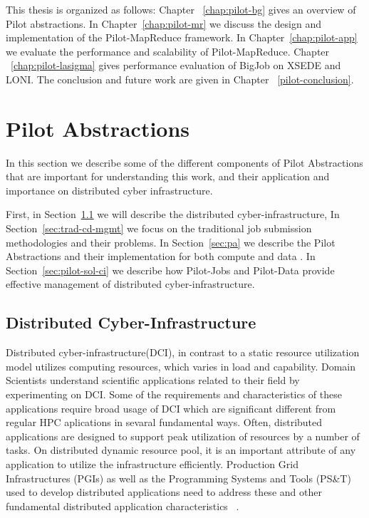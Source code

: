 \documentclass[12pt]{report}
\newcommand{\pilot}{Pilot\xspace}
\newcommand{\pilotmapreduce}{Pilot-MapReduce\xspace}
\begin{document}
This thesis is organized as follows: Chapter ~\ref{chap:pilot-bg} gives an overview of \pilot
abstractions. In Chapter~\ref{chap:pilot-mr} we discuss the design and implementation of the \pilotmapreduce framework.
In Chapter~\ref{chap:pilot-app} we evaluate the performance and scalability  of  \pilotmapreduce.
Chapter ~\ref{chap:pilot-lasigma} gives performance evaluation of BigJob on XSEDE and LONI. The conclusion and future work are given in Chapter ~\ref{pilot-conclusion}.

\chapter{Pilot Abstractions} \label{chap:bg}

In this section we describe some of the different components of Pilot Abstractions that are important for understanding this work, and their application and 
importance on distributed cyber infrastructure. 

First, in Section~\ref{sec:ci} we will describe the distributed cyber-infrastructure,  In Section~\ref{sec:trad-cd-mgmt} we focus on the traditional job submission methodologies and their problems. 
 In Section~\ref{sec:pa} we describe the Pilot Abstractions and their implementation for both compute and data . In Section~\ref{sec:pilot-sol-ci} we describe how Pilot-Jobs and Pilot-Data provide
effective management of distributed cyber-infrastructure.

\section{Distributed Cyber-Infrastructure} \label{sec:ci}

Distributed cyber-infrastructure(DCI), in contrast to a static resource utilization model utilizes computing resources, which varies in load and capability.
Domain Scientists understand scientific applications related to their field by experimenting on DCI. Some of the requirements and characteristics of these 
applications require broad usage of DCI which are significant different from regular HPC aplications in sevaral fundamental ways. Often, distributed applications 
are designed to support peak utilization of resources by a number of tasks. On distributed dynamic resource pool, it is an important attribute of any application to
utilize the infrastructure efficiently. Production Grid Infrastructures (PGIs) as well as the Programming Systems and Tools (PS\&T) used to develop distributed 
applications need to address these and other fundamental distributed application characteristics ~\cite{bigjob-1}.
\end{document}

